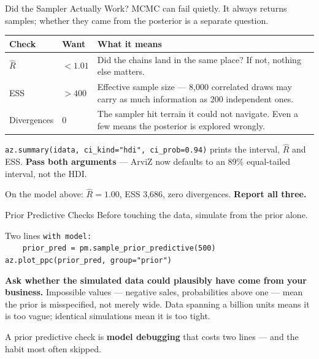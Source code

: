 \documentclass[aspectratio=169, 11pt]{beamer}
\begin{document}
\begin{frame}{Did the Sampler Actually Work? \parencite{MartinKumarLao2021}}
  MCMC can fail quietly. It always returns samples; whether they came from the posterior is a
  separate question.
  \begin{center}
    {\small
    \begin{tabular}{p{2.5cm}p{3.0cm}p{6.6cm}}
      \toprule
      \textbf{Check} & \textbf{Want} & \textbf{What it means} \\
      \midrule
      $\hat{R}$ & $< 1.01$ & Did the chains land in the same place? If not, nothing else
      matters. \\[2pt]
      ESS & $> 400$ & Effective sample size --- 8{,}000 correlated draws may carry as much
      information as 200 independent ones. \\[2pt]
      Divergences & $0$ & The sampler hit terrain it could not navigate. Even a few means the
      posterior is explored wrongly. \\
      \bottomrule
    \end{tabular}
    }
  \end{center}

  \texttt{az.summary(idata, ci\_kind="hdi", ci\_prob=0.94)} prints the interval, $\hat{R}$ and ESS.
  \textbf{Pass both arguments} --- ArviZ now defaults to an 89\% equal-tailed interval, not the HDI.

  On the model above: $\hat{R} = 1.00$, ESS 3{,}686, zero divergences. \textbf{Report all three.}
\end{frame}

\begin{frame}{Prior Predictive Checks \parencite{McElreath2020}}
  Before touching the data, simulate from the prior alone.

  \begin{examplebox}{Two lines}
    {\scriptsize\linespread{1.0}\selectfont
    \texttt{with model:}\\
    \texttt{\ \ \ \ prior\_pred = pm.sample\_prior\_predictive(500)}\\[2pt]
    \texttt{az.plot\_ppc(prior\_pred, group="prior")}
    }
  \end{examplebox}

  \textbf{Ask whether the simulated data could plausibly have come from your business.}
  Impossible values --- negative sales, probabilities above one --- mean the prior is
  misspecified, not merely wide. Data spanning a billion units means it is too vague; identical
  simulations mean it is too tight.

  \begin{keybox}
    A prior predictive check is \textbf{model debugging} that costs two lines --- and the habit
    most often skipped.
  \end{keybox}
\end{frame}
\end{document}
